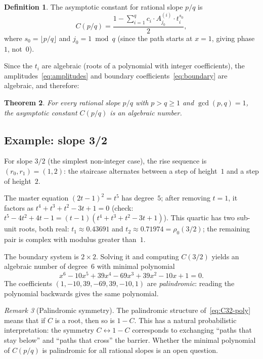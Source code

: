 \documentclass[11pt]{article}
\newtheorem{theorem}{Theorem}[section]
\theoremstyle{definition}
\newtheorem{definition}[theorem]{Definition}
\theoremstyle{remark}
\newtheorem{remark}[theorem]{Remark}
\newcommand{\floor}[1]{\lfloor #1 \rfloor}
\begin{document}
\begin{definition}
The asymptotic constant for rational slope $p/q$ is
\begin{equation}\label{eq:C-rational}
C(p/q) = \frac{1 - \sum_{i=1}^{q} c_i \cdot A_{j_0}^{(i)} \cdot
t_i^{s_0}}{2},
\end{equation}
where $s_0 = \floor{p/q}$ and $j_0 = 1 \bmod q$ (since the path
starts at $x = 1$, giving phase $1$, not~$0$).
\end{definition}

Since the $t_i$ are algebraic (roots of a polynomial with integer
coefficients), the amplitudes~\eqref{eq:amplitudes} and boundary
coefficients~\eqref{eq:boundary} are algebraic, and therefore:

\begin{theorem}\label{thm:algebraic}
For every rational slope $p/q$ with $p > q \geq 1$ and
$\gcd(p, q) = 1$, the asymptotic constant $C(p/q)$ is an algebraic
number.
\end{theorem}

\subsection{Example: slope 3/2}

For slope $3/2$ (the simplest non-integer case), the rise sequence is
$(r_0, r_1) = (1, 2)$: the staircase alternates between a step of
height~$1$ and a step of height~$2$.

The master equation $(2t - 1)^2 = t^5$ has degree~$5$; after
removing $t = 1$, it factors as $t^4 + t^3 + t^2 - 3t + 1 = 0$
(check: $t^5 - 4t^2 + 4t - 1 = (t-1)(t^4 + t^3 + t^2 - 3t + 1)$).
This quartic has two sub-unit roots, both real:
$t_1 \approx 0.43691$ and $t_2 \approx 0.71974 = \rho_0(3/2)$;
the remaining pair is complex with modulus greater than~$1$.

The boundary system is $2 \times 2$.
Solving it and computing $C(3/2)$ yields an algebraic number of
degree~$6$ with minimal polynomial
\begin{equation}\label{eq:C32-poly}
x^6 - 10x^5 + 39x^4 - 69x^3 + 39x^2 - 10x + 1 = 0.
\end{equation}
The coefficients $(1, -10, 39, -69, 39, -10, 1)$ are
\emph{palindromic}: reading the polynomial backwards gives the same
polynomial.

\begin{remark}[Palindromic symmetry]
The palindromic structure of~\eqref{eq:C32-poly} means that if $C$
is a root, then so is $1 - C$.
This has a natural probabilistic interpretation: the symmetry
$C \leftrightarrow 1 - C$ corresponds to exchanging ``paths that
stay below'' and ``paths that cross'' the barrier.
Whether the minimal polynomial of $C(p/q)$ is palindromic for all
rational slopes is an open question.
\end{remark}
\end{document}
